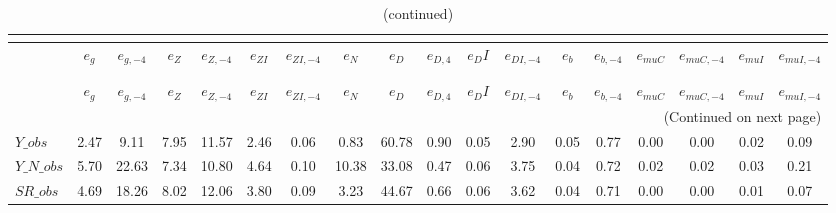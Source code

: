  
\begin{center}
\begin{longtable}{lccccccccccccccccc} 
\caption{VARIANCE DECOMPOSITION (in percent)}\\
 \label{Table:th_var_decomp_uncond}\\
\toprule 
$               $	 & 	 $           {e_g}$	 & 	 $      {e_{g,-4}}$	 & 	 $           {e_Z}$	 & 	 $      {e_{Z,-4}}$	 & 	 $        {e_{ZI}}$	 & 	 $     {e_{ZI,-4}}$	 & 	 $           {e_N}$	 & 	 $           {e_D}$	 & 	 $       {e_{D,4}}$	 & 	 $          {e_DI}$	 & 	 $     {e_{DI,-4}}$	 & 	 $           {e_b}$	 & 	 $      {e_{b,-4}}$	 & 	 $       {e_{muC}}$	 & 	 $    {e_{muC,-4}}$	 & 	 $       {e_{muI}}$	 & 	 $    {e_{muI,-4}}$\\
\midrule \endfirsthead 
\caption{(continued)}\\
 \toprule \\ 
$               $	 & 	 $           {e_g}$	 & 	 $      {e_{g,-4}}$	 & 	 $           {e_Z}$	 & 	 $      {e_{Z,-4}}$	 & 	 $        {e_{ZI}}$	 & 	 $     {e_{ZI,-4}}$	 & 	 $           {e_N}$	 & 	 $           {e_D}$	 & 	 $       {e_{D,4}}$	 & 	 $          {e_DI}$	 & 	 $     {e_{DI,-4}}$	 & 	 $           {e_b}$	 & 	 $      {e_{b,-4}}$	 & 	 $       {e_{muC}}$	 & 	 $    {e_{muC,-4}}$	 & 	 $       {e_{muI}}$	 & 	 $    {e_{muI,-4}}$\\
\midrule \endhead 
\midrule \multicolumn{18}{r}{(Continued on next page)} \\ \bottomrule \endfoot 
\bottomrule \endlastfoot 
$Y\_obs         $	 & 	            2.47	 & 	            9.11	 & 	            7.95	 & 	           11.57	 & 	            2.46	 & 	            0.06	 & 	            0.83	 & 	           60.78	 & 	            0.90	 & 	            0.05	 & 	            2.90	 & 	            0.05	 & 	            0.77	 & 	            0.00	 & 	            0.00	 & 	            0.02	 & 	            0.09 \\ 
$Y\_N\_obs      $	 & 	            5.70	 & 	           22.63	 & 	            7.34	 & 	           10.80	 & 	            4.64	 & 	            0.10	 & 	           10.38	 & 	           33.08	 & 	            0.47	 & 	            0.06	 & 	            3.75	 & 	            0.04	 & 	            0.72	 & 	            0.02	 & 	            0.02	 & 	            0.03	 & 	            0.21 \\ 
$SR\_obs        $	 & 	            4.69	 & 	           18.26	 & 	            8.02	 & 	           12.06	 & 	            3.80	 & 	            0.09	 & 	            3.23	 & 	           44.67	 & 	            0.66	 & 	            0.06	 & 	            3.62	 & 	            0.04	 & 	            0.71	 & 	            0.00	 & 	            0.00	 & 	            0.01	 & 	            0.07 \\ 

\end{longtable}
\end{center}
